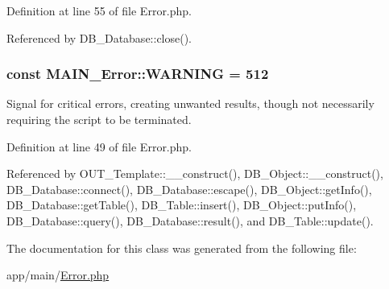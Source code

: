 Definition at line 55 of file Error.php.

Referenced by DB\_\-Database::close().\hypertarget{classMAIN__Error_af47cc28f788d73c277a78761621fd711}{
\subsubsection[{WARNING}]{\setlength{\rightskip}{0pt plus 5cm}const {\bf MAIN\_\-Error::WARNING} = 512}}
\label{d4/d5e/classMAIN__Error_af47cc28f788d73c277a78761621fd711}
Signal for critical errors, creating unwanted results, though not necessarily requiring the script to be terminated. 

Definition at line 49 of file Error.php.

Referenced by OUT\_\-Template::\_\-\_\-construct(), DB\_\-Object::\_\-\_\-construct(), DB\_\-Database::connect(), DB\_\-Database::escape(), DB\_\-Object::getInfo(), DB\_\-Database::getTable(), DB\_\-Table::insert(), DB\_\-Object::putInfo(), DB\_\-Database::query(), DB\_\-Database::result(), and DB\_\-Table::update().

The documentation for this class was generated from the following file:\begin{DoxyCompactItemize}
\item 
app/main/\hyperlink{Error_8php}{Error.php}\end{DoxyCompactItemize}
